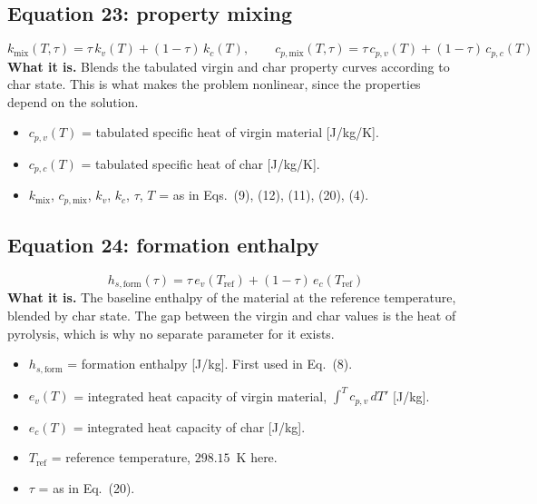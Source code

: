 \documentclass[11pt]{article}
\begin{document}
\subsection*{Equation 23: property mixing}
\begin{equation}
k_{\mathrm{mix}}(T,\tau) = \tau\, k_v(T) + (1-\tau)\, k_c(T),
\qquad
c_{p,\mathrm{mix}}(T,\tau) = \tau\, c_{p,v}(T) + (1-\tau)\, c_{p,c}(T)
\end{equation}
\textbf{What it is.} Blends the tabulated virgin and char property curves
according to char state. This is what makes the problem nonlinear, since the
properties depend on the solution.
\begin{itemize}
  \item $c_{p,v}(T)$ = tabulated specific heat of virgin material [J/kg/K].
  \item $c_{p,c}(T)$ = tabulated specific heat of char [J/kg/K].
  \item $k_{\mathrm{mix}}$, $c_{p,\mathrm{mix}}$, $k_v$, $k_c$, $\tau$, $T$ = as
        in Eqs.~(9), (12), (11), (20), (4).
\end{itemize}

\subsection*{Equation 24: formation enthalpy}
\begin{equation}
h_{s,\mathrm{form}}(\tau) = \tau\, e_v(T_{\mathrm{ref}}) + (1-\tau)\, e_c(T_{\mathrm{ref}})
\end{equation}
\textbf{What it is.} The baseline enthalpy of the material at the reference
temperature, blended by char state. The gap between the virgin and char values is
the heat of pyrolysis, which is why no separate parameter for it exists.
\begin{itemize}
  \item $h_{s,\mathrm{form}}$ = formation enthalpy [J/kg]. First used in Eq.~(8).
  \item $e_v(T)$ = integrated heat capacity of virgin material,
        $\int^T c_{p,v}\,dT'$ [J/kg].
  \item $e_c(T)$ = integrated heat capacity of char [J/kg].
  \item $T_{\mathrm{ref}}$ = reference temperature, $298.15$~K here.
  \item $\tau$ = as in Eq.~(20).
\end{itemize}
\end{document}
